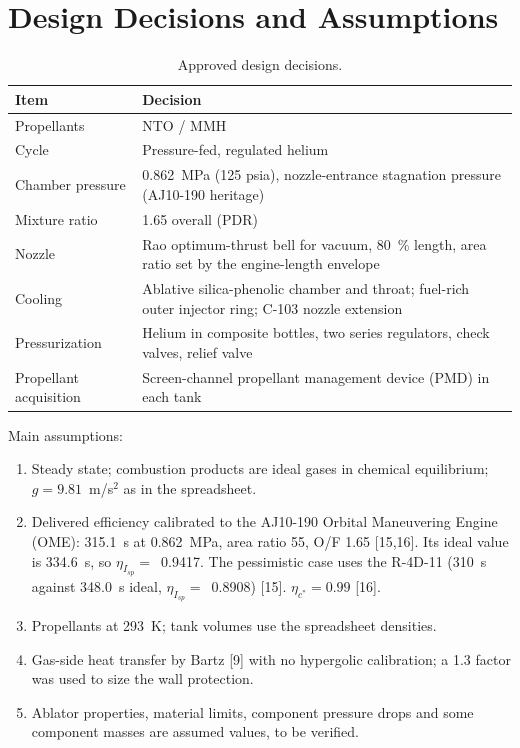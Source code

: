 \documentclass[10pt]{article}
\newcommand{\NetaI}{0.9417}
\newcommand{\NetaP}{0.8908}
\newcommand{\NOMEideal}{334.6}
\newcommand{\NRfourideal}{348.0}
\begin{document}
\section{Design Decisions and Assumptions}
\begin{table}[H]\centering\small\caption{Approved design decisions.}\label{tab:dec}
\begin{tabular}{lp{11.5cm}}\toprule Item & Decision \\\midrule
Propellants & NTO / MMH \\
Cycle & Pressure-fed, regulated helium \\
Chamber pressure & 0.862~MPa (125 psia), nozzle-entrance stagnation pressure (AJ10-190 heritage) \\
Mixture ratio & 1.65 overall (PDR) \\
Nozzle & Rao optimum-thrust bell for vacuum, 80~\% length, area ratio set by the engine-length envelope \\
Cooling & Ablative silica-phenolic chamber and throat; fuel-rich outer injector ring; C-103 nozzle extension \\
Pressurization & Helium in composite bottles, two series regulators, check valves, relief valve \\
Propellant acquisition & Screen-channel propellant management device (PMD) in each tank \\
\bottomrule\end{tabular}\end{table}

Main assumptions:
\begin{enumerate}
\item Steady state; combustion products are ideal gases in chemical equilibrium; $g = 9.81$~m/s$^2$ as in the spreadsheet.
\item Delivered efficiency calibrated to the AJ10-190 Orbital Maneuvering Engine (OME): 315.1~s at 0.862~MPa, area ratio 55,
O/F 1.65 [15,16]. Its ideal value is \NOMEideal~s, so $\eta_{I_{sp}} = $~\NetaI. The pessimistic case uses the R-4D-11
(310~s against \NRfourideal~s ideal, $\eta_{I_{sp}} = $~\NetaP) [15]. $\eta_{c^*} = 0.99$ [16].
\item Propellants at 293~K; tank volumes use the spreadsheet densities.
\item Gas-side heat transfer by Bartz [9] with no hypergolic calibration; a 1.3 factor was used to size the wall protection.
\item Ablator properties, material limits, component pressure drops and some component masses are assumed values, to be
verified.
\end{enumerate}
\end{document}
